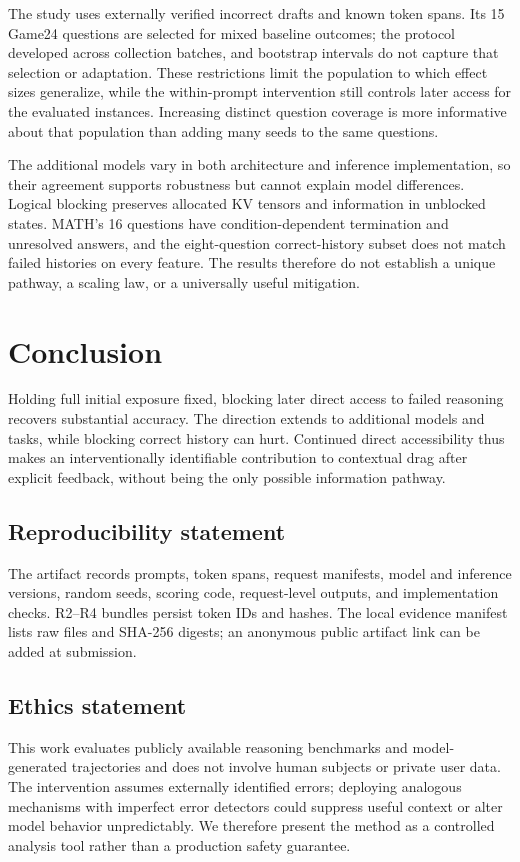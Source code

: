 \documentclass{article}
\begin{document}
The study uses externally verified incorrect drafts and known token spans. Its 15 Game24 questions are selected for mixed baseline outcomes; the protocol developed across collection batches, and bootstrap intervals do not capture that selection or adaptation. These restrictions limit the population to which effect sizes generalize, while the within-prompt intervention still controls later access for the evaluated instances. Increasing distinct question coverage is more informative about that population than adding many seeds to the same questions.

The additional models vary in both architecture and inference implementation, so their agreement supports robustness but cannot explain model differences. Logical blocking preserves allocated KV tensors and information in unblocked states. MATH's 16 questions have condition-dependent termination and unresolved answers, and the eight-question correct-history subset does not match failed histories on every feature. The results therefore do not establish a unique pathway, a scaling law, or a universally useful mitigation.

\section{Conclusion}

Holding full initial exposure fixed, blocking later direct access to failed reasoning recovers substantial accuracy. The direction extends to additional models and tasks, while blocking correct history can hurt. Continued direct accessibility thus makes an interventionally identifiable contribution to contextual drag after explicit feedback, without being the only possible information pathway.

\subsection*{Reproducibility statement}
The artifact records prompts, token spans, request manifests, model and inference versions, random seeds, scoring code, request-level outputs, and implementation checks. R2--R4 bundles persist token IDs and hashes. The local evidence manifest lists raw files and SHA-256 digests; an anonymous public artifact link can be added at submission.

\subsection*{Ethics statement}
This work evaluates publicly available reasoning benchmarks and model-generated trajectories and does not involve human subjects or private user data. The intervention assumes externally identified errors; deploying analogous mechanisms with imperfect error detectors could suppress useful context or alter model behavior unpredictably. We therefore present the method as a controlled analysis tool rather than a production safety guarantee.
\end{document}
